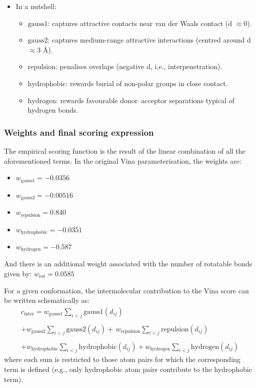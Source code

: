 \documentclass[12pt]{article}
\begin{document}
\begin{itemize}
\item In a nutshell:
\begin{itemize}
  \item $\textrm{gauss1}$: captures attractive contacts near van der Waals contact (d $\approx 0$).
  \item $\textrm{gauss2}$: captures medium-range attractive interactions (centred around d $\approx 3$ \r{A}).
  \item $\textrm{repulsion}$: penalises overlaps (negative d, i.e., interpenetration).
  \item $\textrm{hydrophobic}$: rewards burial of non-polar groups in close contact.
  \item $\textrm{hydrogen}$: rewards favourable donor–acceptor separations typical of hydrogen bonds.
\end{itemize}
\end{itemize}

\subsubsection{Weights and final scoring expression}
The empirical scoring function is the result of the linear combination of all the aforementioned terms.
In the original Vina parameterisation, the weights are\cite{CH7_trott2010vina}:
\begin{itemize}
\item $w_{\textrm{gauss1}} = -0.0356$
\item $w_{\textrm{gauss2}} = -0.00516$
\item $w_{\textrm{repulsion}} = 0.840$
\item $w_{\textrm{hydrophobic}} = -0.0351$
\item $w_{\textrm{hydrogen}} = -0.587$
\end{itemize}
And there is an additional weight associated with the number of rotatable bonds given by: $w_{\textrm{rot}} = 0.0585$

For a given conformation, the intermolecular contribution to the Vina score can be written schematically as:
\begin{equation}
  \begin{aligned}
  c_{\textrm{inter}} =
    w_{\textrm{gauss1}} \sum_{i < j} \textrm{gauss1}\!\left(d_{ij}\right) \\\\
  + w_{\textrm{gauss2}} \sum_{i < j} \textrm{gauss2}\!\left(d_{ij}\right) 
  +\, w_{\textrm{repulsion}} \sum_{i < j} \textrm{repulsion}\!\left(d_{ij}\right) \\\\ 
  + w_{\textrm{hydrophobic}} \sum_{i < j} \textrm{hydrophobic}\!\left(d_{ij}\right) 
  + w_{\textrm{hydrogen}} \sum_{i < j} \textrm{hydrogen}\!\left(d_{ij}\right) 
  \end{aligned}
\end{equation}
where each sum is restricted to those atom pairs for which the corresponding term is defined (e.g., only hydrophobic atom pairs contribute to the hydrophobic term).
\end{document}
